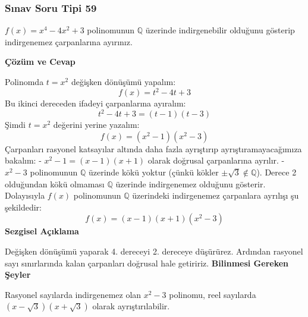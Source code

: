 \documentclass[11pt, a4paper]{article}
\newenvironment{cozum}{
    \vspace{0.5cm}
    \noindent\textcolor{green!60!black}{\faCheckCircle\enspace \textbf{\Large Çözüm ve Cevap}}\par\vspace{0.2cm}
}{}
\newenvironment{sezgisel}{
    \vspace{0.5cm}
    \noindent\textcolor{orange!80!black}{\faLightbulb\enspace \textbf{\Large Sezgisel Açıklama}}\par\vspace{0.2cm}
    \itshape
}{}
\newenvironment{bilgi}{
    \vspace{0.5cm}
    \noindent\textcolor{red!70!black}{\faExclamationTriangle\enspace \textbf{\Large Bilinmesi Gereken Şeyler}}\par\vspace{0.2cm}
}{}
\begin{document}
\subsubsection{Sınav Soru Tipi 59}
\begin{sinavbox}
$f(x) = x^4-4x^2+3$ polinomunun $\mathbb{Q}$ üzerinde indirgenebilir olduğunu gösterip indirgenemez çarpanlarına ayırınız.
\end{sinavbox}
\begin{cozum}
Polinomda $t = x^2$ değişken dönüşümü yapalım:
\[ f(x) = t^2 - 4t + 3 \]
Bu ikinci dereceden ifadeyi çarpanlarına ayıralım:
\[ t^2 - 4t + 3 = (t-1)(t-3) \]
Şimdi $t = x^2$ değerini yerine yazalım:
\[ f(x) = (x^2-1)(x^2-3) \]
Çarpanları rasyonel katsayılar altında daha fazla ayrıştırıp ayrıştıramayacağımıza bakalım:
- $x^2-1 = (x-1)(x+1)$ olarak doğrusal çarpanlarına ayrılır.
- $x^2-3$ polinomunun $\mathbb{Q}$ üzerinde kökü yoktur (çünkü kökler $\pm \sqrt{3} \notin \mathbb{Q}$). Derece 2 olduğundan kökü olmaması $\mathbb{Q}$ üzerinde indirgenemez olduğunu gösterir.
Dolayısıyla $f(x)$ polinomunun $\mathbb{Q}$ üzerindeki indirgenemez çarpanlara ayrılışı şu şekildedir:
\[ f(x) = (x-1)(x+1)(x^2-3) \]
\end{cozum}
\begin{sezgisel}
Değişken dönüşümü yaparak 4. dereceyi 2. dereceye düşürürez. Ardından rasyonel sayı sınırlarında kalan çarpanları doğrusal hale getiririz.
\end{sezgisel}
\begin{bilgi}
Rasyonel sayılarda indirgenemez olan $x^2-3$ polinomu, reel sayılarda $(x-\sqrt{3})(x+\sqrt{3})$ olarak ayrıştırılabilir.
\end{bilgi}

\newpage
\end{document}
